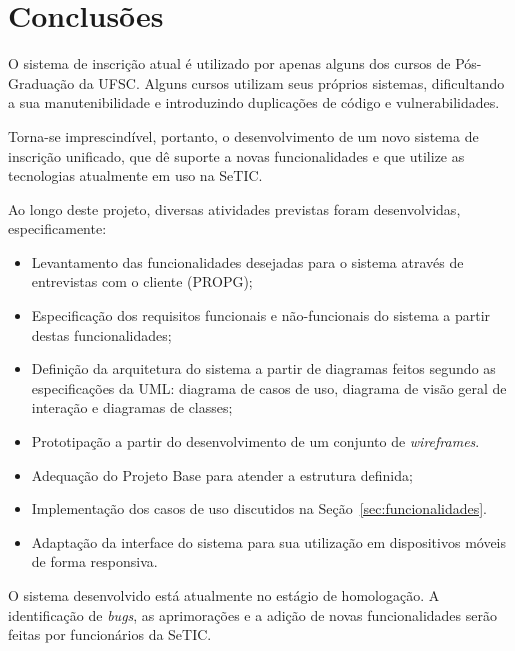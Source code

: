 \documentclass[
  10.5pt,				  %
	openright,			%
	twoside,			  %
  a5paper,
  chapter=TITLE,	%
	section=TITLE,	%
  hyphens,        %
	english,        %
	brazil          %
]{abntex2}
\begin{document}
\chapter{Conclusões}

O sistema de inscrição atual é utilizado por apenas alguns dos cursos de Pós-Graduação da UFSC. Alguns cursos utilizam seus próprios sistemas, dificultando a sua manutenibilidade e introduzindo duplicações de código e vulnerabilidades.

Torna-se imprescindível, portanto, o desenvolvimento de um novo sistema de inscrição unificado, que dê suporte a novas funcionalidades e que utilize as tecnologias atualmente em uso na SeTIC.

Ao longo deste projeto, diversas atividades previstas foram desenvolvidas, especificamente:
\begin{itemize}
  \item Levantamento das funcionalidades desejadas para o sistema através de entrevistas com o cliente (PROPG);
  \item Especificação dos requisitos funcionais e não-funcionais do sistema a partir destas funcionalidades;
  \item Definição da arquitetura do sistema a partir de diagramas feitos segundo as especificações da UML: diagrama de casos de uso, diagrama de visão geral de interação e diagramas de classes;
  \item Prototipação a partir do desenvolvimento de um conjunto de \emph{wireframes}.
  \item Adequação do Projeto Base para atender a estrutura definida;
  \item Implementação dos casos de uso discutidos na Seção~\ref{sec:funcionalidades}.
  \item Adaptação da interface do sistema para sua utilização em dispositivos móveis de forma responsiva.
\end{itemize}

O sistema desenvolvido está atualmente no estágio de homologação. A identificação de \emph{bugs}, as aprimorações e a adição de novas funcionalidades serão feitas por funcionários da SeTIC.



%
\end{document}
